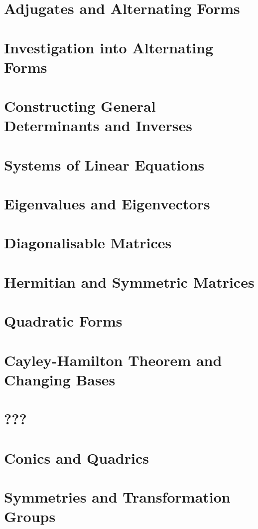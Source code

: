 \documentclass{article}
\begin{document}
\section{Adjugates and Alternating Forms}

\section{Investigation into Alternating Forms}

\section{Constructing General Determinants and Inverses}

\section{Systems of Linear Equations}

\section{Eigenvalues and Eigenvectors}

\section{Diagonalisable Matrices}

\section{Hermitian and Symmetric Matrices}

\section{Quadratic Forms}

\section{Cayley-Hamilton Theorem and Changing Bases}

\section{???}

\section{Conics and Quadrics}

\section{Symmetries and Transformation Groups}

\end{document}
